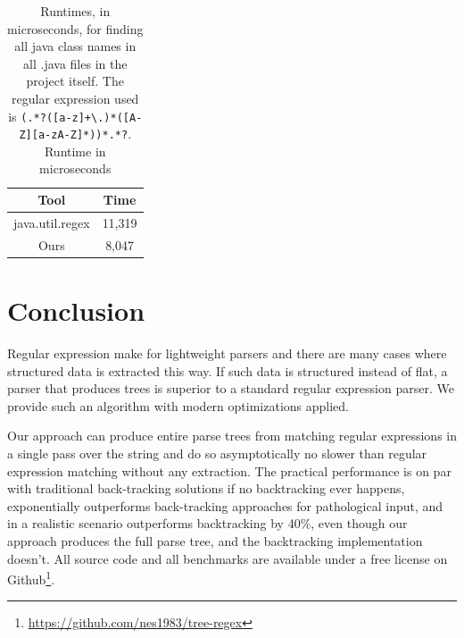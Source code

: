 \documentclass[11pt]{Thesis}
\theoremstyle{definition}
\newcommand{\tablabel}[1]{\label{tab:#1}}
\begin{document}
\begin{table}[htp]\center
\begin{tabular}{cc}
\toprule
Tool & Time\tabularnewline
\midrule
java.util.regex & 11,319\tabularnewline
Ours & 8,047\tabularnewline
\bottomrule
\end{tabular}
\caption[Matching times for finding all java class names]{Runtimes, in microseconds, for finding all java class names in all
  .java files in the project itself. The regular expression used is
  \texttt{(.*?([a-z]+\textbackslash.)*([A-Z][a-zA-Z]*))*.*?}.
Runtime in microseconds}
\tablabel{real}
\end{table}


\chapter{Conclusion}
Regular expression make for lightweight parsers and there are many cases 
where structured data is extracted this way. If such data is structured 
instead of flat, a parser that produces trees is superior to a standard 
regular expression parser. We provide such an algorithm with modern 
optimizations applied.

Our approach can produce entire parse trees from matching regular expressions
in a single pass over the string and do so asymptotically no slower than 
regular expression matching without any extraction.  The practical performance
is on par with traditional back-tracking solutions if no backtracking ever
happens, exponentially outperforms back-tracking approaches for pathological
input, and in a realistic scenario outperforms backtracking by 40\%, even
though our approach produces the full parse tree, and the backtracking
implementation doesn't. All source code and all benchmarks are available under
a free license on Github\footnote{\url{https://github.com/nes1983/tree-regex}}.




\listoffigures
\listoftables
\listofalgorithms
{}
\end{document}
